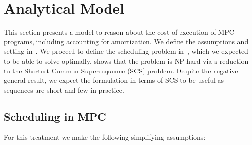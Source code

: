 \section{Analytical Model}
\label{sec:model}


This section presents a model to reason about the cost of execution of MPC programs, including accounting for amortization.
We define the assumptions and setting in~. We proceed to define the scheduling problem in~, 
which we expected to be able to solve optimally.  shows that the problem is NP-hard via a reduction to the 
Shortest Common Supersequence (SCS) problem. Despite the negative general result, we expect the formulation in terms of SCS to 
be useful as sequences are short and few in practice.



\subsection{Scheduling in MPC}
\label{sec:mpc}


For this treatment we make the following simplifying assumptions:

